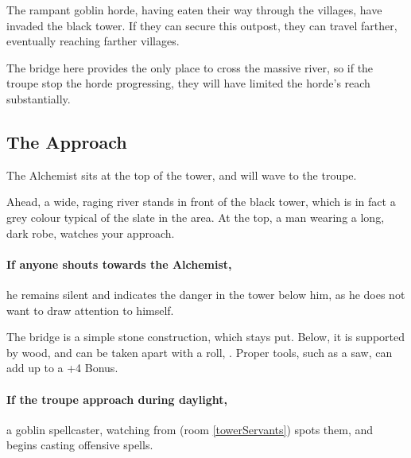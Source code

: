 \begin{multicols}{2}

\noindent
\begin{exampletext}
  The rampant goblin horde, having eaten their way through the villages, have invaded the black tower.
  If they can secure this outpost, they can travel farther, eventually reaching farther villages.

  The bridge here provides the only place to cross the massive river, so if the troupe stop the horde progressing, they will have limited the horde's reach substantially.
\end{exampletext}


\subsection{The Approach}

The Alchemist sits at the top of the tower, and will wave to the troupe.

\begin{boxtext}

  Ahead, a wide, raging river stands in front of the black tower, which is in fact a grey colour typical of the slate in the area.
  At the top, a man wearing a long, dark robe, watches your approach.

\end{boxtext}

\paragraph{If anyone shouts towards the Alchemist,}
he remains silent and indicates the danger in the tower below him, as he does not want to draw attention to himself.


The bridge is a simple stone construction, which stays put.
Below, it is supported by wood, and can be taken apart with a  roll, \tn[14].
Proper tools, such as a saw, can add up to a +4 Bonus.

\paragraph{If the troupe approach during daylight,}
a goblin spellcaster, watching from  (room \ref{towerServants}) spots them, and begins casting offensive spells.


\end{multicols}
